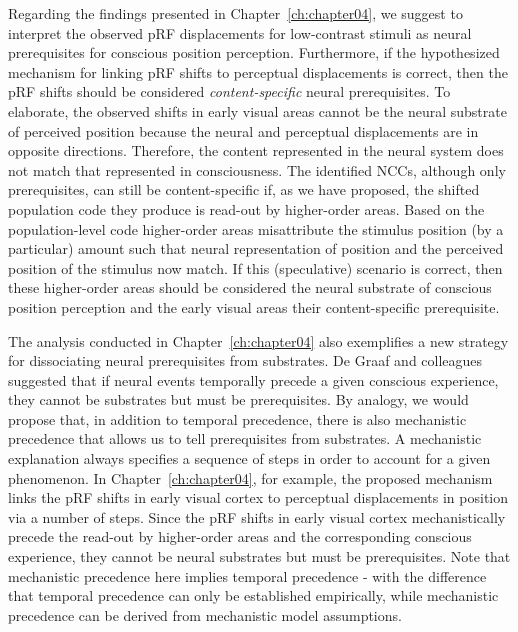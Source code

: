 Regarding the findings presented in Chapter~\ref{ch:chapter04}, we suggest to interpret the observed pRF displacements for low-contrast stimuli as neural prerequisites for conscious position perception. Furthermore, if the hypothesized mechanism for linking pRF shifts to perceptual displacements is correct, then the pRF shifts should be considered \textit{content-specific} neural prerequisites. To elaborate, the observed shifts in early visual areas cannot be the neural substrate of perceived position because the neural and perceptual displacements are in opposite directions. Therefore, the content represented in the neural system does not match that represented in consciousness. The identified NCCs, although only prerequisites, can still be content-specific if, as we have proposed, the shifted population code they produce is read-out by higher-order areas. Based on the population-level code higher-order areas misattribute the stimulus position (by a particular) amount such that neural representation of position and the perceived position of the stimulus now match. If this (speculative) scenario is correct, then these higher-order areas should be considered the neural substrate of conscious position perception and the early visual areas their content-specific prerequisite.

The analysis conducted in Chapter~\ref{ch:chapter04} also exemplifies a new strategy for dissociating neural prerequisites from substrates. De Graaf and colleagues \parencite*{DeGraaf2012} suggested that if neural events temporally precede a given conscious experience, they cannot be substrates but must be prerequisites. By analogy, we would propose that, in addition to temporal precedence, there is also mechanistic precedence that allows us to tell prerequisites from substrates. A mechanistic explanation always specifies a sequence of steps in order to account for a given phenomenon. In Chapter~\ref{ch:chapter04}, for example, the proposed mechanism links the pRF shifts in early visual cortex to perceptual displacements in position via a number of steps. Since the pRF shifts in early visual cortex mechanistically precede the read-out by higher-order areas and the corresponding conscious experience, they cannot be neural substrates but must be prerequisites. Note that mechanistic precedence here implies temporal precedence - with the difference that temporal precedence can only be established empirically, while mechanistic precedence can be derived from mechanistic model assumptions.

